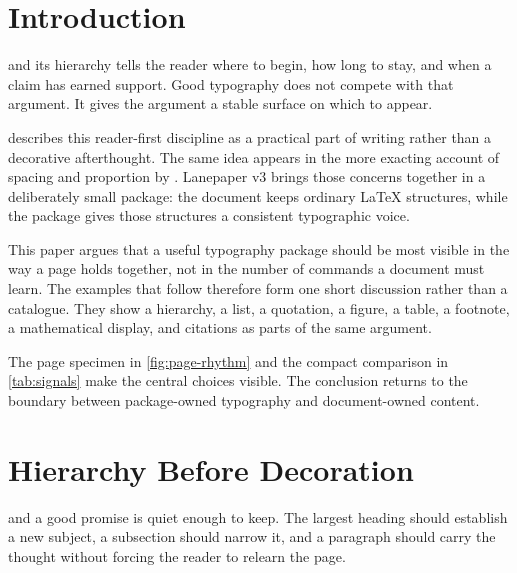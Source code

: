\documentclass[11pt]{article}
\begin{document}



\section{Introduction}
\label{sec:introduction}

 and its hierarchy
tells the reader where to begin, how long to stay, and when a claim has earned
support.
Good typography does not compete with that argument.
It gives the argument a stable surface on which to appear.

\textcite{butterick2019practical} describes this reader-first discipline as a
practical part of writing rather than a decorative afterthought.
The same idea appears in the more exacting account of spacing and proportion by
\textcite{hochuli1987detail}.
Lanepaper v3 brings those concerns together in a deliberately small package:
the document keeps ordinary LaTeX structures, while the package gives those
structures a consistent typographic voice.

This paper argues that a useful typography package should be most visible in
the way a page holds together, not in the number of commands a document must
learn.
The examples that follow therefore form one short discussion rather than a
catalogue.
They show a hierarchy, a list, a quotation, a figure, a table, a footnote, a
mathematical display, and citations as parts of the same argument.

The page specimen in \cref{fig:page-rhythm} and the compact comparison in
\cref{tab:signals} make the central choices visible.
The conclusion returns to the boundary between package-owned typography and
document-owned content.

\section{Hierarchy Before Decoration}
\label{sec:hierarchy}

 and a good promise is
quiet enough to keep.
The largest heading should establish a new subject, a subsection should narrow
it, and a paragraph should carry the thought without forcing the reader to
relearn the page.
\end{document}
